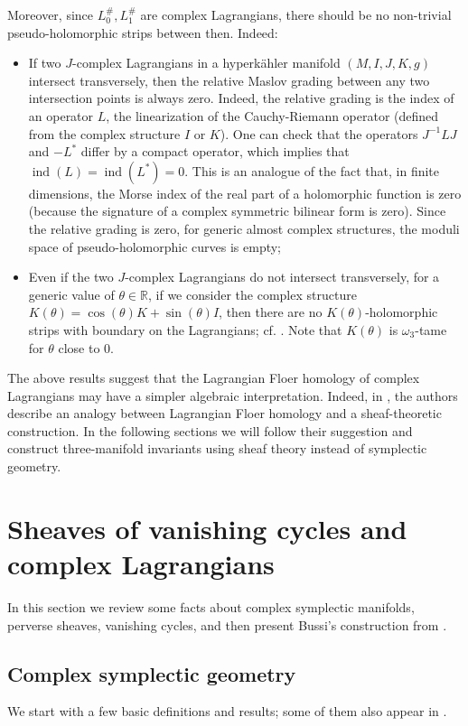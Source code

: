 \documentclass [11pt]{amsart}
\theoremstyle{remark}
\def\rr {{\mathbb{R}}}
\def\R{\rr}
\def\ind{\operatorname{ind}}
\begin{document}
Moreover, since $L^{\#}_0, L^{\#}_1$ are complex Lagrangians, there should be no non-trivial pseudo-holomorphic strips between then. Indeed:
\begin{itemize}
\item If two $J$-complex Lagrangians in a hyperk\"ahler manifold $(M, I, J, K, g)$ intersect transversely, then the relative Maslov grading between any two intersection points is always zero. Indeed, the relative grading is the index of an operator $L$, the linearization of the Cauchy-Riemann operator (defined from the complex structure $I$ or $K$). One can check that the operators $J^{-1}LJ$ and $-L^*$ differ by a compact operator, which implies that $\ind(L) = \ind(L^*) = 0.$ This is an analogue of the fact that, in finite dimensions, the Morse index of the real part of a holomorphic function is zero (because the signature of a complex symmetric bilinear form is zero). Since the relative grading is zero, for generic almost complex structures, the moduli space of pseudo-holomorphic curves is empty;

\item Even if the two $J$-complex Lagrangians do not intersect transversely, for a generic value of $\theta \in \R$, if we consider the complex structure $K(\theta) =\cos(\theta) K +  \sin(\theta) I$, then there are no $K(\theta)$-holomorphic strips with boundary on the Lagrangians; cf. \cite{SolomonVerbitsky}. Note that $K(\theta)$ is $\omega_3$-tame for $\theta$ close to $0$.
\end{itemize}

The above results suggest that the Lagrangian Floer homology of complex Lagrangians may have a simpler algebraic interpretation. Indeed, in \cite[Remark 6.15]{BBDJS}, the authors describe an analogy between Lagrangian Floer homology and a sheaf-theoretic construction. In the following sections we will follow their suggestion and construct three-manifold invariants using sheaf theory instead of symplectic geometry.





\section{Sheaves of vanishing cycles and complex Lagrangians}
\label{sec:sheaves}
In this section we review some facts about complex symplectic manifolds, perverse sheaves, vanishing cycles, and then present Bussi's construction from \cite{Bussi}.

\subsection{Complex symplectic geometry}
We start with a few basic definitions and results; some of them also appear in \cite[Section 1.3]{Bussi}.
\end{document}
